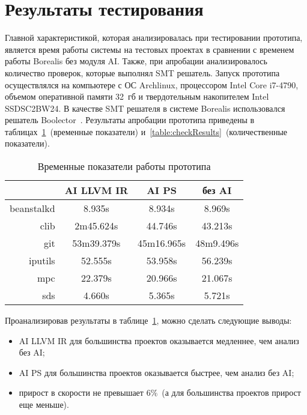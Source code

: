 \section{Результаты тестирования}
Главной характеристикой, которая анализировалась при тестировании прототипа, 
является время работы системы на тестовых проектах в сравнении с временем
работы Borealis без модуля AI. Также, при апробации анализировалось количество 
проверок, которые выполнял SMT решатель. Запуск прототипа осуществлялся на 
компьютере с ОС Archlinux, процессором Intel Core i7-4790, объемом оперативной 
памяти 32~гб и твердотельным накопителем Intel SSDSC2BW24. В качестве SMT 
решателя в системе Borealis использовался решатель Boolector~\cite{boolector}. 
Результаты апробации прототипа приведены в 
таблицах~\ref{table:timeResults}~(временные показатели) 
и~\ref{table:checkResults}~(количественные показатели).
\begin{table}
\captionsetup{skip=5pt}
\caption{Временные показатели работы прототипа}
\centering
\begin{tabular}{|r|c|c|c|}
\hline
           & AI LLVM IR   & AI PS        & без AI    \\ \hline
beanstalkd & 8.935s       & 8.934s       & 8.969s    \\ \hline
clib       & 2m45.624s    & 44.746s      & 43.213s   \\ \hline
git        & 53m39.379s   & 45m16.965s   & 48m9.496s \\ \hline
iputils    & 52.555s      & 53.958s      & 56.239s   \\ \hline
mpc        & 22.379s      & 20.966s      & 21.067s   \\ \hline
sds        & 4.660s       & 5.365s       & 5.721s    \\ \hline
\end{tabular}
\label{table:timeResults}
\end{table}

Проанализировав результаты в таблице~\ref{table:timeResults}, можно сделать 
следующие выводы:
\begin{itemize}
\item AI LLVM IR для большинства проектов оказывается медленнее, чем
анализ без AI;
\item AI PS для большинства проектов оказывается быстрее, чем анализ
без AI;
\item прирост в скорости не превышает $6\%$~(а для большинства проектов прирост
еще меньше).
\end{itemize}

